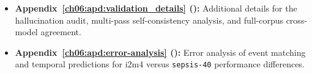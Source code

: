 \begin{itemize}
    \item \textbf{Appendix~\ref{ch06:apd:validation_details} ():} Additional details for the hallucination audit, multi-pass self-consistency analysis, and full-corpus cross-model agreement.

    \item \textbf{Appendix~\ref{ch06:apd:error-analysis} ():} Error analysis of event matching and temporal predictions for i2m4 versus \texttt{sepsis-40} performance differences.
\end{itemize}




